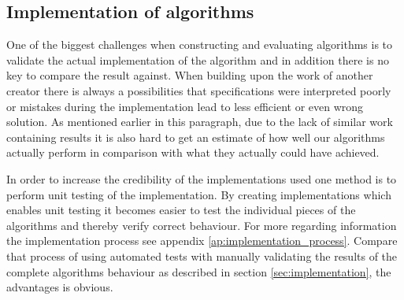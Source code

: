 \subsection{Implementation of algorithms }
One of the biggest challenges when constructing and evaluating algorithms is to validate the actual implementation of the algorithm and in addition there is no key to compare the result against. When building upon the work of another creator there is always a possibilities that specifications were interpreted poorly or mistakes during the implementation lead to less efficient or even wrong solution. As mentioned earlier in this paragraph, due to the lack of similar work containing results it is also hard to get an estimate of how well our algorithms actually perform in comparison with what they actually could have achieved. 

In order to increase the credibility of the implementations used one method is to perform unit testing of the implementation. By creating implementations which enables unit testing it becomes easier to test the individual pieces of the algorithms and thereby verify correct behaviour. For more regarding information the implementation process see appendix \ref{ap:implementation_process}. Compare that process of using automated tests with manually validating the results of the complete algorithms behaviour as described in section \ref{sec:implementation}, the advantages is obvious. 
